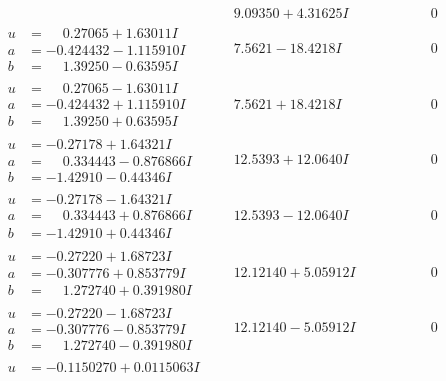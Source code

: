 \documentclass[1p]{elsarticle_modified}
\theoremstyle{definition}
\begin{document}
$$\begin{array}{c|c|c}
 & \phantom{-}9.09350 + 4.31625 I & \phantom{-0.000000 } 0 \\ \hline\begin{aligned}
u &= \phantom{-}0.27065 + 1.63011 I \\
a &= -0.424432 - 1.115910 I \\
b &= \phantom{-}1.39250 - 0.63595 I\end{aligned}
 & \phantom{-}7.5621 - 18.4218 I & \phantom{-0.000000 } 0 \\ \hline\begin{aligned}
u &= \phantom{-}0.27065 - 1.63011 I \\
a &= -0.424432 + 1.115910 I \\
b &= \phantom{-}1.39250 + 0.63595 I\end{aligned}
 & \phantom{-}7.5621 + 18.4218 I & \phantom{-0.000000 } 0 \\ \hline\begin{aligned}
u &= -0.27178 + 1.64321 I \\
a &= \phantom{-}0.334443 - 0.876866 I \\
b &= -1.42910 - 0.44346 I\end{aligned}
 & \phantom{-}12.5393 + 12.0640 I & \phantom{-0.000000 } 0 \\ \hline\begin{aligned}
u &= -0.27178 - 1.64321 I \\
a &= \phantom{-}0.334443 + 0.876866 I \\
b &= -1.42910 + 0.44346 I\end{aligned}
 & \phantom{-}12.5393 - 12.0640 I & \phantom{-0.000000 } 0 \\ \hline\begin{aligned}
u &= -0.27220 + 1.68723 I \\
a &= -0.307776 + 0.853779 I \\
b &= \phantom{-}1.272740 + 0.391980 I\end{aligned}
 & \phantom{-}12.12140 + 5.05912 I & \phantom{-0.000000 } 0 \\ \hline\begin{aligned}
u &= -0.27220 - 1.68723 I \\
a &= -0.307776 - 0.853779 I \\
b &= \phantom{-}1.272740 - 0.391980 I\end{aligned}
 & \phantom{-}12.12140 - 5.05912 I & \phantom{-0.000000 } 0 \\ \hline\begin{aligned}
u &= -0.1150270 + 0.0115063 I \\

\end{aligned}
\end{array}$$
\end{document}
